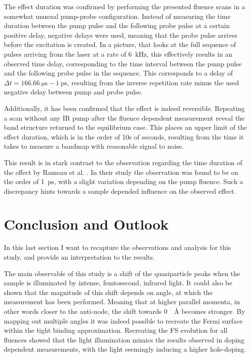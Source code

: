 The effect duration was confirmed by performing the presented fluence scans in a somewhat unusual pump-probe configuration.
Instead of measuring the time duration between the pump pulse and the following probe pulse at a certain positive delay, negative delays were used, meaning that the probe pulse arrives before the excitation is created.
In a picture, that looks at the full sequence of pulses arriving from the laser at a rate of \qty{6}{\kilo\hertz}, this effectively results in an observed time delay, corresponding to the time interval between the pump pulse and the following probe pulse in the sequence.
This corresponds to a delay of $\Delta t = \qty{166.66}{\micro\second} - \qty{1}{\pico\second}$, resulting from the inverse repetition rate minus the used negative delay between pump and probe pulse.

Additionally, it has been confirmed that the effect is indeed reversible.
Repeating a scan without any IR pump after the fluence dependent measurement reveal the band structure returned to the equilibrium case.
This places an upper limit of the effect duration, which is in the order of 10s of seconds, resulting from the time it takes to measure a bandmap with reasonable signal to noise.

This result is in stark contrast to the observation regarding the time duration of the effect by Rameau et al. \cite{rameau_photoinduced_2014}.
In their study the observation was found to be on the order of \qty{1}{\pico\second}, with a slight variation depending on the pump fluence.
Such a discrepancy hints towards a sample depended influence on the observed effect.

\section{Conclusion and Outlook}

In this last section I want to recapture the observations and analysis for this study, and provide an interpretation to the results.

The main observable of this study is a shift of the quasiparticle peaks when the sample is illuminated by intense, femtosecond, infrared light.
It could also be shown that the magnitude of this shift depends on angle, at which the measurement has been performed.
Meaning that at higher parallel momenta, in other words closer to the anti-node, the shift towards \qty{0}{\per\angstrom} becomes stronger.
By mapping out multiple angles it was indeed possible to recreate the Fermi surface within the tight binding approximation.
Recreating the FS evolution for all fluences showed that the light illumination mimics the results observed in doping dependent measurements, with the light seemingly inducing a higher hole-doping.


